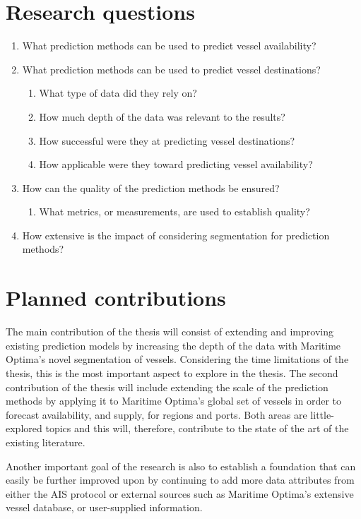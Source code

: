 \section{Research questions}


\begin{enumerate}
    \item What prediction methods can be used to predict vessel availability?
    \item What prediction methods can be used to predict vessel destinations?
    \begin{enumerate}
        \item What type of data did they rely on?
        \item How much depth of the data was relevant to the results?
        \item How successful were they at predicting vessel destinations?
        \item How applicable were they toward predicting vessel availability?
    \end{enumerate}
    \item How can the quality of the prediction methods be ensured?
    \begin{enumerate}
        \item What metrics, or measurements, are used to establish quality?
    \end{enumerate}
    \item How extensive is the impact of considering segmentation for prediction methods?
\end{enumerate}

\section{Planned contributions}

The main contribution of the thesis will consist of extending and improving existing prediction models by increasing the depth of the data with Maritime Optima’s novel segmentation of vessels. Considering the time limitations of the thesis, this is the most important aspect to explore in the thesis. The second contribution of the thesis will include extending the scale of the prediction methods by applying it to Maritime Optima’s global set of vessels in order to forecast availability, and supply, for regions and ports. Both areas are little-explored topics and this will, therefore, contribute to the state of the art of the existing literature.


Another important goal of the research is also to establish a foundation that can easily be further improved upon by continuing to add more data attributes from either the AIS protocol or external sources such as Maritime Optima’s extensive vessel database, or user-supplied information.
